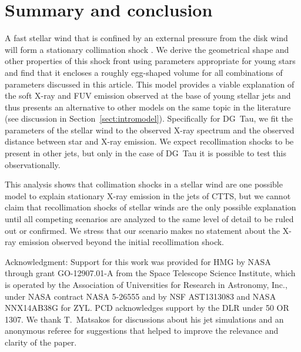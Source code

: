 \section{Summary and conclusion}
\label{sect:summary}
A fast stellar wind that is confined by an external pressure from the disk wind will form a stationary collimation shock \citep{2012MNRAS.422.2282K}. We derive the geometrical shape and other properties of this shock front using parameters appropriate for young stars and find that it encloses a roughly egg-shaped volume for all combinations of parameters discussed in this article. This model provides a viable explanation of the soft X-ray and FUV emission observed at the base of young stellar jets and thus presents an alternative to other models on the same topic in the literature (see discussion in Section~\ref{sect:intromodel}). Specifically for DG~Tau, we fit the parameters of the stellar wind to the observed X-ray spectrum and the observed distance between star and X-ray emission.  We expect recollimation shocks to be present in other jets, but only in the case of DG~Tau it is possible to test this observationally.

This analysis shows that collimation shocks in a stellar wind are one possible model to explain stationary X-ray emission in the jets of CTTS, but we cannot claim that recollimation shocks of stellar winds are the only possible explanation until all competing scenarios are analyzed to the same level of detail to be ruled out or confirmed. We stress that our scenario makes no statement about the X-ray emission observed beyond the initial recollimation shock.




Acknowledgment: 
Support for this work was provided for HMG by NASA through grant GO-12907.01-A from the Space Telescope Science Institute, which is operated by the Association of Universities for Research in Astronomy, Inc., under NASA contract NASA 5-26555 and by NSF AST1313083 and NASA NNX14AB38G for ZYL. PCD acknowledges support by the DLR under 50 OR 1307. We thank T.~Matsakos for discussions about his jet simulations and an anonymous referee for suggestions that helped to improve the relevance and clarity of the paper.